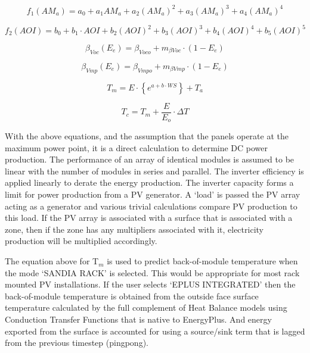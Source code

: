 \begin{equation}
{f_1}\left( {A{M_a}} \right) = {a_0} + {a_1}A{M_a} + {a_2}{\left( {A{M_a}} \right)^2} + {a_3}{\left( {A{M_a}} \right)^3} + {a_4}{\left( {A{M_a}} \right)^4}
\end{equation}

\begin{equation}
{f_2}\left( {AOI} \right) = {b_0} + {b_1} \cdot AOI + {b_2}{\left( {AOI} \right)^2} + {b_3}{\left( {AOI} \right)^3} + {b_4}{\left( {AOI} \right)^4} + {b_5}{\left( {AOI} \right)^5}
\end{equation}

\begin{equation}
{\beta_{Voc}}({E_e}) = {\beta_{Voco}} + {m_{\beta Voc}} \cdot (1 - {E_e})
\end{equation}

\begin{equation}
{\beta_{Vmp}}({E_e}) = {\beta_{Vmpo}} + {m_{\beta Vmp}} \cdot (1 - {E_e})
\end{equation}

\begin{equation}
{T_m} = E \cdot \left\{ {{e^{a + b \cdot WS}}} \right\} + {T_a}
\end{equation}

\begin{equation}
{T_c} = {T_m} + \frac{E}{{{E_o}}} \cdot \Delta T
\end{equation}

With the above equations, and the assumption that the panels operate at the maximum power point, it is a direct calculation to determine DC power production. The performance of an array of identical modules is assumed to be linear with the number of modules in series and parallel. The inverter efficiency is applied linearly to derate the energy production. The inverter capacity forms a limit for power production from a PV generator. A `load' is passed the PV array acting as a generator and various trivial calculations compare PV production to this load. If the PV array is associated with a surface that is associated with a zone, then if the zone has any multipliers associated with it, electricity production will be multiplied accordingly.

The equation above for T\(_{m}\) is used to predict back-of-module temperature when the mode `SANDIA RACK' is selected. This would be appropriate for most rack mounted PV installations. If the user selects `EPLUS INTEGRATED' then the back-of-module temperature is obtained from the outside face surface temperature calculated by the full complement of Heat Balance models using Conduction Transfer Functions that is native to EnergyPlus. And energy exported from the surface is accounted for using a source/sink term that is lagged from the previous timestep (pingpong).

